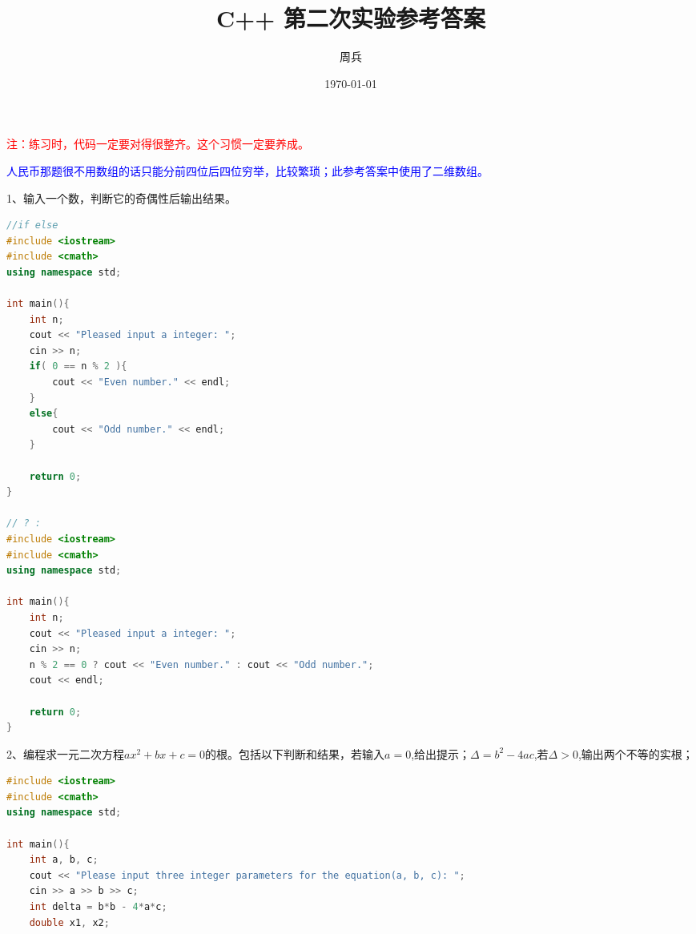 \documentclass[14pt,aps,prb]{revtex4}
\begin{document}
\begin{spacing}{1.5}

\title{C++ 第二次实验参考答案}
\author{周兵}

\date{\today}%
\maketitle


\textcolor{red}{注：练习时，代码一定要对得很整齐。这个习惯一定要养成。}

\textcolor{blue}{人民币那题很不用数组的话只能分前四位后四位穷举，比较繁琐；此参考答案中使用了二维数组。}

1、输入一个数，判断它的奇偶性后输出结果。
\begin{lstlisting}[language=C++]
//if else
#include <iostream>
#include <cmath>
using namespace std;

int main(){
    int n;
    cout << "Pleased input a integer: ";
    cin >> n;
    if( 0 == n % 2 ){
        cout << "Even number." << endl;
    }
    else{
        cout << "Odd number." << endl;
    }
	
    return 0;
}

// ? :
#include <iostream>
#include <cmath>
using namespace std;

int main(){
    int n;
    cout << "Pleased input a integer: ";
    cin >> n;
    n % 2 == 0 ? cout << "Even number." : cout << "Odd number.";
    cout << endl;
	
    return 0;
}
\end{lstlisting}

2、编程求一元二次方程$ax^2+bx+c=0$的根。包括以下判断和结果，若输入$a=0$,给出提示；$\Delta=b^2-4ac $,若$\Delta>0$,输出两个不等的实根；
\begin{lstlisting}[language=C++]
#include <iostream>
#include <cmath>
using namespace std;

int main(){
    int a, b, c;
    cout << "Please input three integer parameters for the equation(a, b, c): ";
    cin >> a >> b >> c;
    int delta = b*b - 4*a*c;
    double x1, x2;


\end{lstlisting}
\end{spacing}
\end{document}
